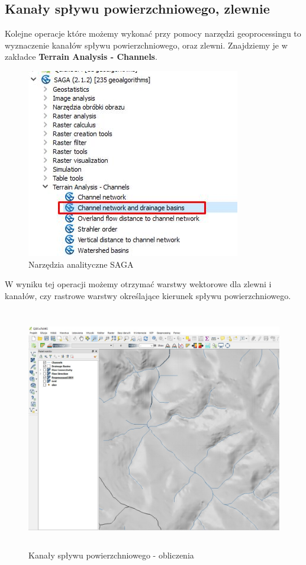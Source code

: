 \documentclass[12pt,a4paper]{book}
\begin{document}
\subsection{Kanały spływu powierzchniowego, zlewnie}
Kolejne operacje które możemy wykonać przy pomocy narzędzi geoprocessingu to wyznaczenie kanałów spływu powierzchniowego, oraz zlewni. Znajdziemy je w zakładce \textbf{Terrain Analysis - Channels}.



\begin{center}
\begin{figure}
\includegraphics[width=9.338cm,height=8.255cm]{004-saga-anali.jpg}
\caption{Narzędzia analityczne SAGA}
\end{figure}
\end{center}
W wyniku tej operacji możemy otrzymać warstwy wektorowe dla zlewni i kanałów, czy rastrowe warstwy określające kierunek spływu powierzchniowego.

\begin{center}
\begin{figure}
\includegraphics[width=13cm,height=10.587cm]{004-saga-splyw.jpg}
\caption{Kanały spływu powierzchniowego - obliczenia}
\end{figure}
\end{center}
\end{document}
